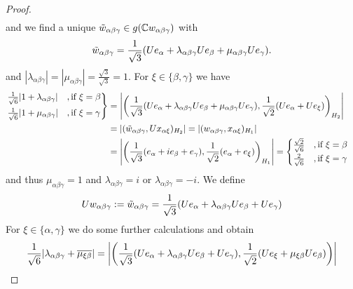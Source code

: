 \begin{proof}
\begin{align*}
	\end{align*}
	and we find a unique $\tilde{w}_{\alpha \beta \gamma} \in g(\mathbb{C} w_{\alpha \beta \gamma})$ with
	\begin{align*}
		\tilde{w}_{\alpha \beta \gamma} = \frac{1}{\sqrt{3}} {\left ( Ue_\alpha + \lambda_{\alpha \beta \gamma} Ue_\beta + \mu_{\alpha \beta \gamma} Ue_\gamma \right )}.
	\end{align*}
	and $|\lambda_{\alpha \beta \gamma}| = |\mu_{\alpha \beta \gamma}| = \frac{\sqrt{3}}{\sqrt{3}} = 1$. For $\xi \in \{\beta, \gamma\}$ we have
	\begin{align*}
		\begin{rcases}
			\frac{1}{\sqrt{6}} |1 + \lambda_{\alpha \beta \gamma}| &, \text{if } \xi = \beta \\
			\frac{1}{\sqrt{6}} |1 + \mu_{\alpha \beta \gamma}| &, \text{if } \xi = \gamma
		\end{rcases}
		&= {\left | {\left ( \frac{1}{\sqrt{3}} {\left ( Ue_\alpha + \lambda_{\alpha \beta \gamma} Ue_\beta + \mu_{\alpha \beta \gamma} Ue_\gamma \right )}, \frac{1}{\sqrt{2}} (Ue_\alpha + Ue_\xi) \right )}_{H_2} \right |} \\
		&= {\left | (\tilde{w}_{\alpha \beta \gamma}, Ux_{\alpha \xi})_{H_2} \right |} = {\left | (w_{\alpha \beta \gamma}, x_{\alpha \xi})_{H_1} \right |} \\
		&= {\left | {\left ( \frac{1}{\sqrt{3}} {\left ( e_\alpha + ie_\beta + e_\gamma \right )}, \frac{1}{\sqrt{2}} (e_\alpha + e_\xi) \right )}_{H_1} \right |} = 
		\begin{cases}
			\frac{\sqrt{2}}{\sqrt{6}} &, \text{if } \xi = \beta \\
			\frac{2}{\sqrt{6}} &, \text{if } \xi = \gamma
		\end{cases}
	\end{align*}
	and thus $\mu_{\alpha \beta \gamma} = 1$ and $\lambda_{\alpha \beta \gamma} = i$ or $\lambda_{\alpha \beta \gamma} = -i$. We define
	\begin{align*}
		Uw_{\alpha \beta \gamma} := \tilde{w}_{\alpha \beta \gamma} = \frac{1}{\sqrt{3}} {\left ( Ue_\alpha + \lambda_{\alpha \beta \gamma} Ue_\beta + Ue_\gamma \right )}
	\end{align*}
	For $\xi \in \{\alpha, \gamma\}$ we do some further calculations and obtain
	\begin{align}
		\frac{1}{\sqrt{6}}\vbraces{\lambda_{\alpha \beta \gamma} + \overline{\mu_{\xi \beta}}}&= \vbraces{\pbraces{\frac{1}{\sqrt{3}} \pbraces{Ue_\alpha + \lambda_{\alpha \beta \gamma} Ue_\beta + Ue_\gamma}, \frac{1}{\sqrt{2}}(Ue_\xi + \mu_{\xi \beta} Ue_\beta)}} \\

\end{align}
\end{proof}
